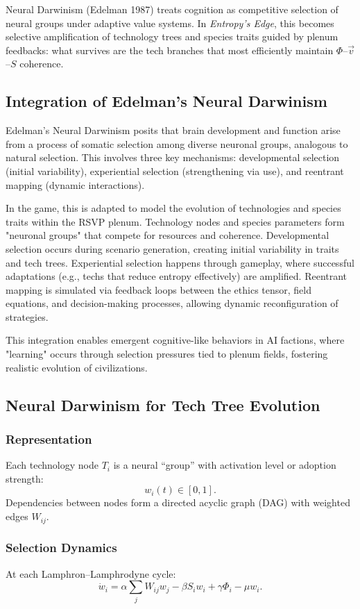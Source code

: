 \documentclass[12pt]{article}
\theoremstyle{definition}
\begin{document}
Neural Darwinism (Edelman 1987) treats cognition as competitive selection of neural groups under adaptive value systems. In \emph{Entropy’s Edge}, this becomes selective amplification of technology trees and species traits guided by plenum feedbacks: what survives are the tech branches that most efficiently maintain $\Phi$–$\vec{v}$–$S$ coherence.

\subsection{Integration of Edelman's Neural Darwinism}
Edelman's Neural Darwinism posits that brain development and function arise from a process of somatic selection among diverse neuronal groups, analogous to natural selection. This involves three key mechanisms: developmental selection (initial variability), experiential selection (strengthening via use), and reentrant mapping (dynamic interactions).

In the game, this is adapted to model the evolution of technologies and species traits within the RSVP plenum. Technology nodes and species parameters form "neuronal groups" that compete for resources and coherence. Developmental selection occurs during scenario generation, creating initial variability in traits and tech trees. Experiential selection happens through gameplay, where successful adaptations (e.g., techs that reduce entropy effectively) are amplified. Reentrant mapping is simulated via feedback loops between the ethics tensor, field equations, and decision-making processes, allowing dynamic reconfiguration of strategies.

This integration enables emergent cognitive-like behaviors in AI factions, where "learning" occurs through selection pressures tied to plenum fields, fostering realistic evolution of civilizations.

\subsection{Neural Darwinism for Tech Tree Evolution}
\subsubsection{Representation}
Each technology node $T_i$ is a neural “group” with activation level or adoption strength:
\[
w_i(t) \in [0,1].
\]
Dependencies between nodes form a directed acyclic graph (DAG) with weighted edges $W_{ij}$.

\subsubsection{Selection Dynamics}
At each Lamphron–Lamphrodyne cycle:
\[
\dot{w}_i = \alpha \sum_j W_{ij} w_j - \beta S_i w_i + \gamma \Phi_i - \mu w_i.
\]
\end{document}
